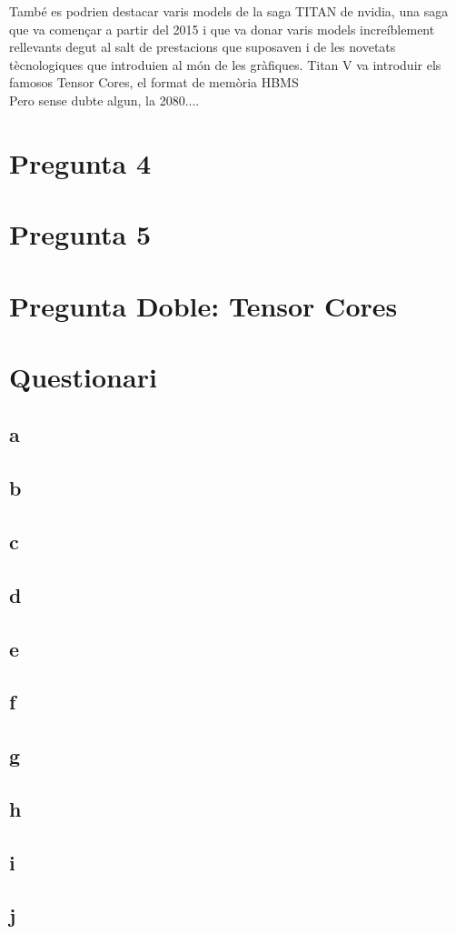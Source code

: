 \documentclass[12pt]{article}
\begin{document}
També es podrien destacar varis models de la saga TITAN de nvidia, una saga que va començar a partir del 2015 i que va donar varis models increíblement rellevants degut al salt de prestacions que suposaven i de les novetats tècnologiques
que introduien al món de les gràfiques. Titan V va introduir els famosos Tensor Cores, el format de memòria HBMS
\\

Pero sense dubte algun, la 2080....




\section{Pregunta 4}

\section{Pregunta 5}


\section{Pregunta Doble: Tensor Cores}

\section{Questionari}

\subsection{a}

\subsection{b}

\subsection{c}

\subsection{d}

\subsection{e}

\subsection{f}

\subsection{g}

\subsection{h}

\subsection{i}

\subsection{j}
\end{document}
